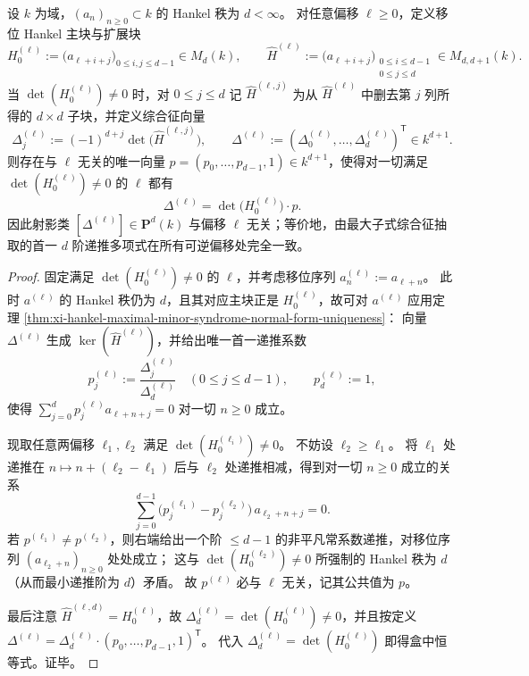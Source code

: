 \begin{theorem}[最大子式综合征的偏移射影不变性与规范化唯一性]\label{thm:xi-hankel-maximal-minor-syndrome-offset-projective-invariance}
设 \(k\) 为域，\((a_n)_{n\ge 0}\subset k\) 的 Hankel 秩为 \(d<\infty\)。
对任意偏移 \(\ell\ge 0\)，定义移位 Hankel 主块与扩展块
\[
H_0^{(\ell)}:=\bigl(a_{\ell+i+j}\bigr)_{0\le i,j\le d-1}\in M_d(k),
\qquad
\widehat H^{(\ell)}:=\bigl(a_{\ell+i+j}\bigr)_{\substack{0\le i\le d-1\\ 0\le j\le d}}\in M_{d,d+1}(k).
\]
当 \(\det(H_0^{(\ell)})\neq 0\) 时，对 \(0\le j\le d\) 记 \(\widehat H^{(\ell,j)}\) 为从 \(\widehat H^{(\ell)}\) 中删去第 \(j\) 列所得的 \(d\times d\) 子块，并定义综合征向量
\[
\Delta_j^{(\ell)}:=(-1)^{d+j}\det\!\bigl(\widehat H^{(\ell,j)}\bigr),
\qquad
\Delta^{(\ell)}:=(\Delta_0^{(\ell)},\dots,\Delta_d^{(\ell)})^{\mathsf T}\in k^{d+1}.
\]
则存在与 \(\ell\) 无关的唯一向量 \(p=(p_0,\dots,p_{d-1},1)\in k^{d+1}\)，使得对一切满足 \(\det(H_0^{(\ell)})\neq 0\) 的 \(\ell\) 都有
\[
\boxed{\;\Delta^{(\ell)}=\det\!\bigl(H_0^{(\ell)}\bigr)\cdot p.\;}
\]
因此射影类 \([\Delta^{(\ell)}]\in\mathbf P^d(k)\) 与偏移 \(\ell\) 无关；等价地，由最大子式综合征抽取的首一 \(d\) 阶递推多项式在所有可逆偏移处完全一致。
\end{theorem}
\begin{proof}
固定满足 \(\det(H_0^{(\ell)})\neq 0\) 的 \(\ell\)，并考虑移位序列 \(a^{(\ell)}_n:=a_{\ell+n}\)。
此时 \(a^{(\ell)}\) 的 Hankel 秩仍为 \(d\)，且其对应主块正是 \(H_0^{(\ell)}\)，故可对 \(a^{(\ell)}\) 应用定理 \ref{thm:xi-hankel-maximal-minor-syndrome-normal-form-uniqueness}：
向量 \(\Delta^{(\ell)}\) 生成 \(\ker(\widehat H^{(\ell)})\)，并给出唯一首一递推系数
\[
p_j^{(\ell)}:=\frac{\Delta_j^{(\ell)}}{\Delta_d^{(\ell)}}\quad(0\le j\le d-1),
\qquad
p_d^{(\ell)}:=1,
\]
使得
\(
\sum_{j=0}^{d}p_j^{(\ell)}a_{\ell+n+j}=0
\)
对一切 \(n\ge 0\) 成立。
\par
现取任意两偏移 \(\ell_1,\ell_2\) 满足 \(\det(H_0^{(\ell_i)})\neq 0\)。
不妨设 \(\ell_2\ge \ell_1\)。
将 \(\ell_1\) 处递推在 \(n\mapsto n+(\ell_2-\ell_1)\) 后与 \(\ell_2\) 处递推相减，得到对一切 \(n\ge 0\) 成立的关系
\[
\sum_{j=0}^{d-1}\bigl(p_j^{(\ell_1)}-p_j^{(\ell_2)}\bigr)\,a_{\ell_2+n+j}=0.
\]
若 \(p^{(\ell_1)}\neq p^{(\ell_2)}\)，则右端给出一个阶 \(\le d-1\) 的非平凡常系数递推，对移位序列 \((a_{\ell_2+n})_{n\ge 0}\) 处处成立；
这与 \(\det(H_0^{(\ell_2)})\neq 0\) 所强制的 Hankel 秩为 \(d\)（从而最小递推阶为 \(d\)）矛盾。
故 \(p^{(\ell)}\) 必与 \(\ell\) 无关，记其公共值为 \(p\)。
\par
最后注意 \(\widehat H^{(\ell,d)}=H_0^{(\ell)}\)，故 \(\Delta_d^{(\ell)}=\det(H_0^{(\ell)})\neq 0\)，并且按定义
\(
\Delta^{(\ell)}=\Delta_d^{(\ell)}\cdot(p_0,\dots,p_{d-1},1)^{\mathsf T}
\)。
代入 \(\Delta_d^{(\ell)}=\det(H_0^{(\ell)})\) 即得盒中恒等式。证毕。
\end{proof}

